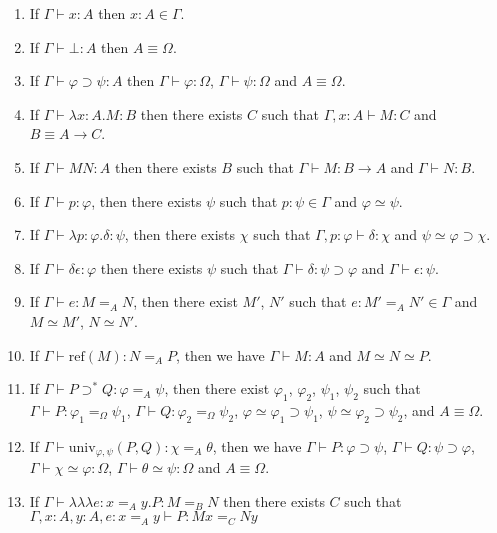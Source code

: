 \documentclass[a4paper,UKenglish]{lipics-v2016}
\newcommand*{\reff}[1]{\ensuremath{\mathrm{ref} \left( {#1} \right)}}
\newcommand*{\univ}[4]{\ensuremath{\mathrm{univ}_{{#1}, {#2}} \left({#3} , {#4} \right)}}
\newcommand*{\triplelambda}{\ensuremath{\lambda \!\! \lambda \!\! \lambda}}
\theoremstyle{plain}
\theoremstyle{definition}
\begin{document}
\begin{lemma}[Generation]
$ $
\begin{enumerate}
\item
If $\Gamma \vdash x : A$ then $x : A \in \Gamma$.
\item
If $\Gamma \vdash \bot : A$ then $A \equiv \Omega$.
\item
If $\Gamma \vdash \varphi \supset \psi : A$ then $\Gamma \vdash \varphi : \Omega$, $\Gamma \vdash \psi : \Omega$ and $A \equiv \Omega$.
\item
If $\Gamma \vdash \lambda x:A.M : B$ then there exists $C$ such that $\Gamma, x : A \vdash M : C$ and $B \equiv A \rightarrow C$.
\item
If $\Gamma \vdash MN : A$ then there exists $B$ such that $\Gamma \vdash M : B \rightarrow A$ and $\Gamma \vdash N : B$.
\item
If $\Gamma \vdash p : \varphi$, then there exists $\psi$ such that $p : \psi \in \Gamma$ and $\varphi \simeq \psi$.
\item
If $\Gamma \vdash \lambda p:\varphi.\delta : \psi$, then there exists $\chi$ such that $\Gamma, p : \varphi \vdash \delta : \chi$ and $\psi \simeq \varphi \supset \chi$.
\item
If $\Gamma \vdash \delta \epsilon : \varphi$ then there exists $\psi$ such that $\Gamma \vdash \delta : \psi \supset \varphi$ and $\Gamma \vdash \epsilon : \psi$.
\item
If $\Gamma \vdash e : M =_A N$, then there exist $M'$, $N'$ such that $e : M' =_A N' \in \Gamma$ and $M \simeq M'$, $N \simeq N'$.
\item
If $\Gamma \vdash \reff{M} : N =_A P$, then we have $\Gamma \vdash M : A$ and $M \simeq N \simeq P$.
\item
If $\Gamma \vdash P \supset^* Q : \varphi =_A \psi$, then there exist $\varphi_1$, $\varphi_2$, $\psi_1$, $\psi_2$ such that
$\Gamma \vdash P : \varphi_1 =_\Omega \psi_1$, $\Gamma \vdash Q : \varphi_2 =_\Omega \psi_2$, $\varphi \simeq \varphi_1 \supset \psi_1$, $\psi \simeq \varphi_2 \supset \psi_2$, and $A \equiv \Omega$.
\item
If $\Gamma \vdash \univ{\varphi}{\psi}{P}{Q} : \chi =_A \theta$, then we have $\Gamma \vdash P : \varphi \supset \psi$, $\Gamma \vdash Q : \psi \supset \varphi$,
$\Gamma \vdash \chi \simeq \varphi : \Omega$, $\Gamma \vdash \theta \simeq \psi : \Omega$ and $A \equiv \Omega$.
\item
If $\Gamma \vdash \triplelambda e : x =_A y. P : M =_B N$ then there exists $C$ such that $\Gamma, x : A, y : A, e : x =_A y \vdash P : M x =_C N y$

\end{enumerate}
\end{lemma}
\end{document}
